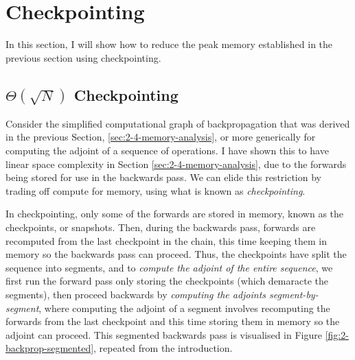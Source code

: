 \section{Checkpointing} \label{sec:2-5-bg-checkpointing}
In this section, I will show how to reduce the peak memory established in the previous section using checkpointing.


\subsection{\texorpdfstring{\(\Theta(\sqrt{N})\)}{\textit{O(sqrt(N))}} Checkpointing}
Consider the simplified computational graph of backpropagation that was derived in the previous Section, \ref{sec:2-4-memory-analysis}, or more generically for computing the adjoint of a sequence of operations.
I have shown this to have linear space complexity in Section \ref{sec:2-4-memory-analysis}, due to the forwards being stored for use in the backwards pass.
We can elide this restriction by trading off compute for memory, using what is known as \textit{checkpointing}.

In checkpointing, only some of the forwards are stored in memory, known as the checkpoints, or snapshots.
Then, during the backwards pass, forwards are recomputed from the last checkpoint in the chain, this time keeping them in memory so the backwards pass can proceed.
Thus, the checkpoints have split the sequence into segments, and
to \textit{compute the adjoint of the entire sequence}, we first run the forward pass only storing the checkpoints (which demaracte the segments),
then proceed backwards by \textit{computing the adjoints segment-by-segment},
where computing the adjoint of a segment involves recomputing the forwards from the last checkpoint and this time storing them in memory so the adjoint can proceed.
This segmented backwards pass is visualised in Figure \ref{fig:2-backprop-segmented}, repeated from the introduction.

